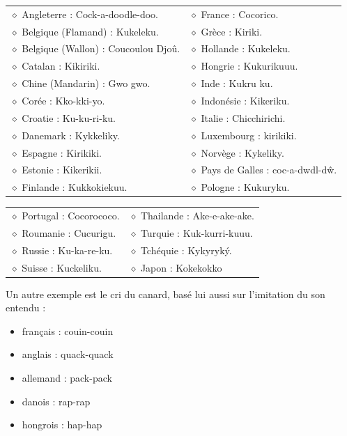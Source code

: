 \begin{center}\small
\begin{tabularx}{\linewidth}{@{}XX@{}}
$\diamond$ Angleterre : Cock-a-doodle-doo. & $\diamond$ France : Cocorico.\\[.5em]
$\diamond$ Belgique (Flamand) : Kukeleku. & $\diamond$ Grèce : Kiriki.\\[.5em]
$\diamond$ Belgique (Wallon) : Coucoulou Djoû. & $\diamond$ Hollande : Kukeleku.\\[.5em]
$\diamond$ Catalan : Kikiriki. & $\diamond$ Hongrie : Kukurikuuu.\\[.5em]
$\diamond$ Chine (Mandarin) : Gwo gwo. & $\diamond$ Inde : Kukru ku.\\[.5em]
$\diamond$ Corée : Kko-kki-yo. & $\diamond$ Indonésie : Kikeriku.\\[.5em]
$\diamond$ Croatie : Ku-ku-ri-ku. & $\diamond$ Italie : Chicchirichi.\\[.5em]
$\diamond$ Danemark : Kykkeliky. & $\diamond$ Luxembourg : kirikiki.\\[.5em]
$\diamond$ Espagne : Kirikiki. & $\diamond$ Norvège : Kykeliky.\\[.5em]
$\diamond$ Estonie : Kikerikii. & $\diamond$ Pays de Galles : coc-a-dwdl-dŵ.\\[.5em]
$\diamond$ Finlande : Kukkokiekuu. & $\diamond$ Pologne : Kukuryku.\\
\end{tabularx}
\end{center}
\begin{center}\small
\begin{tabularx}{\linewidth}{@{}XX@{}}
$\diamond$ Portugal : Cocorococo. & $\diamond$ Thailande : Ake-e-ake-ake.\\[.5em]
$\diamond$ Roumanie : Cucurigu. & $\diamond$ Turquie : Kuk-kurri-kuuu.\\[.5em]
$\diamond$ Russie : Ku-ka-re-ku. & $\diamond$ Tchéquie : Kykyryký.\\[.5em]
$\diamond$ Suisse : Kuckeliku. & $\diamond$ Japon : Kokekokko\\
\end{tabularx}
\end{center}
Un autre exemple est le cri du canard, basé lui aussi sur l’imitation du son entendu :
\begin{itemize}
\item français : couin-couin
\item anglais : quack-quack
\item allemand : pack-pack
\item danois : rap-rap
\item hongrois : hap-hap
\end{itemize}
